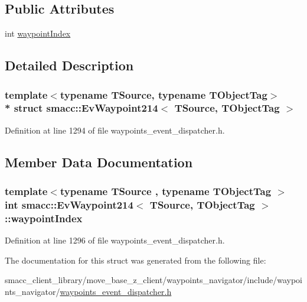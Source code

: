 \subsection*{Public Attributes}
\begin{DoxyCompactItemize}
\item 
int \hyperlink{structsmacc_1_1EvWaypoint214_a1ddd17ac9a3bcc341017038af0adb220}{waypoint\+Index}
\end{DoxyCompactItemize}


\subsection{Detailed Description}
\subsubsection*{template$<$typename T\+Source, typename T\+Object\+Tag$>$\\*
struct smacc\+::\+Ev\+Waypoint214$<$ T\+Source, T\+Object\+Tag $>$}



Definition at line 1294 of file waypoints\+\_\+event\+\_\+dispatcher.\+h.



\subsection{Member Data Documentation}
\subsubsection[{\texorpdfstring{waypoint\+Index}{waypointIndex}}]{\setlength{\rightskip}{0pt plus 5cm}template$<$typename T\+Source , typename T\+Object\+Tag $>$ int {\bf smacc\+::\+Ev\+Waypoint214}$<$ T\+Source, T\+Object\+Tag $>$\+::waypoint\+Index}\hypertarget{structsmacc_1_1EvWaypoint214_a1ddd17ac9a3bcc341017038af0adb220}{}\label{structsmacc_1_1EvWaypoint214_a1ddd17ac9a3bcc341017038af0adb220}


Definition at line 1296 of file waypoints\+\_\+event\+\_\+dispatcher.\+h.



The documentation for this struct was generated from the following file\+:\begin{DoxyCompactItemize}
\item 
smacc\+\_\+client\+\_\+library/move\+\_\+base\+\_\+z\+\_\+client/waypoints\+\_\+navigator/include/waypoints\+\_\+navigator/\hyperlink{waypoints__event__dispatcher_8h}{waypoints\+\_\+event\+\_\+dispatcher.\+h}\end{DoxyCompactItemize}
